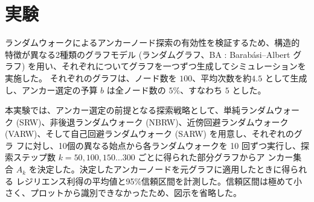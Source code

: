 \documentclass[twocolumn,a4paper, dvipdfmx]{ieicejsp}
\begin{document}

\section{実験}


ランダムウォークによるアンカーノード探索の有効性を検証するため、構造的
特徴が異なる2種類のグラフモデル (ランダムグラフ、BA : Barab\'{a}si--Albert
グラフ) を用い、それぞれについてグラフを一つずつ生成してシミュレーションを実施した。
それぞれのグラフは、ノード数を $100$、平均次数を約$4.5$ として生成し、アンカー選定の予算
$b$ は全ノード数の $5\%$、すなわち $5$ とした。



本実験では、アンカー選定の前提となる探索戦略として、単純ランダムウォー
ク (SRW)、非後退ランダムウォーク (NBRW)、近傍回避ランダムウォーク
(VARW)、そして自己回避ランダムウォーク (SARW) を用意し、それぞれのグラ
フに対し、10個の異なる始点から各ランダムウォークを 10 回ずつ実行し、探
索ステップ数 $k = 50, 100, 150 ... 300$ ごとに得られた部分グラフからア
ンカー集合 $A_k$ を決定した。決定したアンカーノードを元グラフに適用したときに得られる
レジリエンス利得の平均値と95\%信頼区間を計測した。信頼区間は極めて小さく、プロットから識別できなかったため、図示を省略した。

\end{document}
